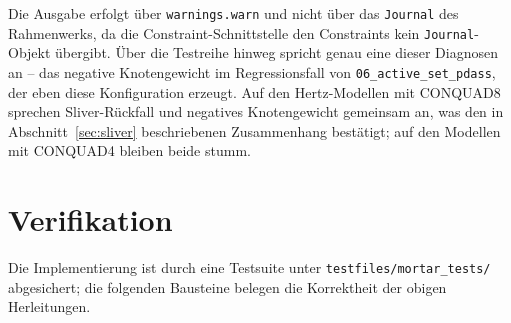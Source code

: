\documentclass[a4paper,11pt]{article}
\newcommand{\code}[1]{\texttt{\small #1}}
\newcommand{\file}[1]{\texttt{\small #1}}
\let\stdsection\section
\renewcommand{\section}{\clearpage\stdsection}
\begin{document}
\noindent Die Ausgabe erfolgt über \code{warnings.warn} und nicht über das \code{Journal} des
Rahmenwerks, da die Constraint-Schnittstelle den Constraints kein \code{Journal}-Objekt übergibt.
Über die Testreihe hinweg spricht genau eine dieser Diagnosen an -- das negative Knotengewicht im
Regressionsfall von \file{06\_active\_set\_pdass}, der eben diese Konfiguration erzeugt. Auf den
Hertz-Modellen mit CONQUAD8 sprechen Sliver-Rückfall und negatives Knotengewicht gemeinsam an, was
den in Abschnitt~\ref{sec:sliver} beschriebenen Zusammenhang bestätigt; auf den Modellen mit
CONQUAD4 bleiben beide stumm.

\section{Verifikation}
\label{sec:verif}

Die Implementierung ist durch eine Testsuite unter \file{testfiles/mortar\_tests/} abgesichert; die
folgenden Bausteine belegen die Korrektheit der obigen Herleitungen.
\end{document}
